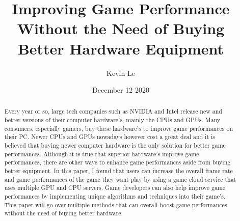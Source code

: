 \documentclass{article}
\title{Improving Game Performance Without the Need of Buying Better Hardware Equipment
}
\author{Kevin Le}
\date{December 12 2020}
\begin{document}
\maketitle

\begin{abstract}
Every year or so, large tech companies such as NVIDIA and Intel release new and better versions of their computer hardware's, mainly the CPUs and GPUs. Many consumers, especially gamers, buy these hardware's to improve game performances on their PC. Newer CPUs and GPUs nowadays however cost a great deal and it is believed that buying newer computer hardware is the only solution for better game performances. Although it is true that superior hardware's improve game performances, there are other ways to enhance game performances aside from buying better equipment. In this paper, I found that users can increase the overall frame rate and game performances of the game they want play by using a game cloud service that uses multiple GPU and CPU servers. Game developers can also help improve game performances by implementing unique algorithms and techniques into their game's. This paper will go over multiple methods that can overall boost game performances without the need of buying better hardware.  
 
\end{abstract}
\end{document}
